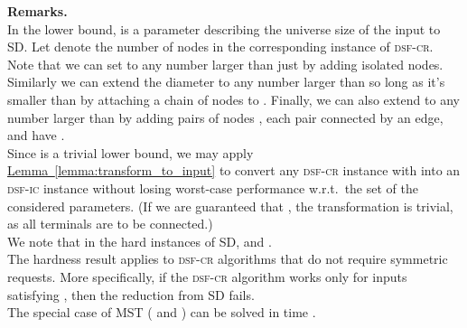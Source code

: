 \documentclass[letterpaper,11pt]{article}
\newcommand{\namedref}[2]{\hyperref[#2]{#1~\ref*{#2}}}
\newcommand{\lemmaref}[1]{\namedref{Lemma}{#1}}
\newcommand{\sfcr}{\textsc{dsf-cr}\xspace}
\newcommand{\sfic}{\textsc{dsf-ic}\xspace}
\begin{document}
\noindent\textbf{Remarks.}
\\  In the lower bound,   is a parameter describing the universe
  size  of the input
  to SD. Let  denote the number of nodes in the  corresponding
  instance of \sfcr. Note that we can set  to any number larger
  than  just by adding 
  isolated nodes. Similarly we can extend the diameter to any number
  larger than  so long as it's smaller than  by attaching
  a chain of  nodes to . Finally, we can also extend
   to any number larger than  by adding pairs of nodes
  , each pair connected  by an edge, and have
  .
\\  Since  is a trivial
lower bound, we may apply
\lemmaref{lemma:transform_to_input} to convert any \sfcr instance with
 into an \sfic instance without losing worst-case performance
w.r.t.\ the 
set of the considered parameters. (If we are
guaranteed that , the transformation is trivial, as all terminals
are to be connected.) 
\\  We note that in the hard instances of SD, 
  and .
\\  The hardness result applies to \sfcr algorithms that do not require
  symmetric requests. More specifically, if the \sfcr algorithm works only
  for inputs satisfying  , then the reduction from
  SD fails.
\\  The special case of MST ( and ) can be solved
in time  \cite{KuttenP-98}. 
\end{document}
